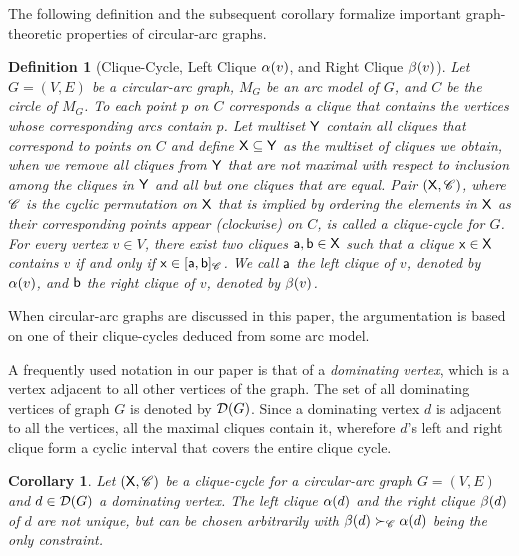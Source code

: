 \documentclass[10pt]{article}
\newtheorem{corollary}[theorem]{Corollary}
\newtheorem{definition}[theorem]{Definition}
\newcommand{\dom}{\fu{D}(G)}\newcommand{\dist}[2]{dist(#1,#2)}\newcommand{\first}[1]{\fu{H}(#1)}\newcommand{\last}[1]{\fu{T}(#1)}
\begin{document}
The following definition and the subsequent corollary formalize important 
graph-theoretic properties of circular-arc graphs.

\begin{definition}[Clique-Cycle, Left Clique $\alpha(v)$, and Right Clique $\beta(v)$]\label{lcrc}
Let $G=(V,E)$ be a circular-arc graph, $M_G$ be an arc model of $G$, and $C$ be the 
circle of $M_G$.
To each point $p$ on $C$ corresponds a clique that contains the vertices 
whose corresponding arcs contain $p$.
Let multiset $\mathsf{Y}$ contain all cliques that correspond 
to points on $C$ and define $\mathsf{X}\subseteq\mathsf{Y}$ as the 
multiset of cliques we obtain, when we remove all cliques from $\mathsf{Y}$ that 
are not maximal with respect to inclusion among the cliques in $\mathsf{Y}$  and all 
but one cliques that are equal.
Pair $(\mathsf{X},\mathscr{C})$, where $\mathscr{C}$ is the cyclic permutation on $\mathsf{X}$ 
that is implied by ordering the elements in $\mathsf{X}$ as their corresponding points appear 
(clockwise) on $C$, is called a \emph{clique-cycle} for $G$. 
For every vertex $v\in V$, there
exist two cliques $\mathsf{a},\mathsf{b}\in\mathsf{X}$ such that a 
clique $\mathsf{x}\in\mathsf{X}$ contains $v$ if and 
only if $\mathsf{x}\in[\mathsf{a},\mathsf{b}]_{\mathscr{C}}$.
We call $\mathsf{a}$ the \emph{left clique of $v$}, denoted by $\alpha(v)$, and $\mathsf{b}$ 
the \emph{right clique of $v$}, denoted by $\beta(v)$.
\end{definition}

When circular-arc graphs are discussed in this paper, the argumentation is based 
on one of their clique-cycles deduced from some arc model.

A frequently used notation in our paper is that of a {\em dominating vertex}, which
is a vertex adjacent to all other vertices of the graph.  The set of all
dominating vertices of graph $G$ is denoted by $\dom$.
Since a dominating vertex $d$ is adjacent to all the vertices, 
all the maximal cliques contain it, wherefore $d$'s left and right clique form a cyclic interval that covers the entire clique cycle.


\begin{corollary}\label{remarkDoms}
Let $(\mathsf{X},\mathscr{C})$ be a clique-cycle for a circular-arc graph $G=(V,E)$ 
and $d\in \dom$ a dominating vertex.
The left clique $\alpha(d)$ and the right clique $\beta(d)$ of $d$ are not unique, 
but can be chosen arbitrarily with 
$\beta(d)\succ_{\mathscr{C}}\alpha(d)$ being the only constraint.
\end{corollary}
\end{document}

